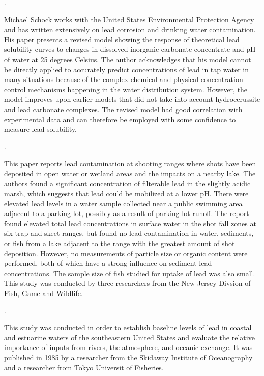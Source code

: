 \documentclass{article}\usepackage[]{graphicx}\usepackage[]{color}
\begin{document}
\noindent {} .


Michael Schock works with the United States Environmental Protection Agency and has written extensively on lead corrosion and drinking water contamination. His paper presents a revised model showing the response of theoretical lead solubility curves to changes in dissolved inorganic carbonate concentrate and pH of water at 25 degrees Celsius. The author acknowledges that his model cannot be directly applied to accurately predict concentrations of lead in tap water in many situations because of the complex chemical and physical concentration control mechanisms happening in the water distribution system. However, the model improves upon earlier models that did not take into account hydrocerussite and lead carbonate complexes. The revised model had good correlation with experimental data and can therefore be employed with some confidence to measure lead solubility.


\noindent {} .


This paper reports lead contamination at shooting ranges where shots have been deposited in open water or wetland areas and the impacts on a nearby lake. The authors found a significant concentration of filterable lead in the slightly acidic marsh, which suggests that lead could be mobilized at a lower pH. There were elevated lead levels in a  water sample collected near a public swimming area adjacent to a parking lot, possibly as a result of parking lot runoff. The report found elevated total lead concentrations in surface water in the shot fall zones at six trap and skeet ranges, but found no lead contamination in water, sediments, or fish from a lake adjacent to the range with the greatest amount of shot deposition. However, no measurements of particle size or organic content were performed, both of which have a strong influence on sediment lead concentrations. The sample size of fish studied for uptake of lead was also small. This study was conducted by three researchers from the New Jersey Divsion of Fish, Game and Wildlife. 


\noindent {} .


This study was conducted in order to establish baseline levels of lead in coastal and estuarine waters of the southeastern United States and evaluate the relative importance of inputs from rivers, the atmosphere, and oceanic exchange. It was published in 1985 by a researcher from the Skidaway Institute of Oceanography and a researcher from Tokyo Universit of Fisheries.
\end{document}

